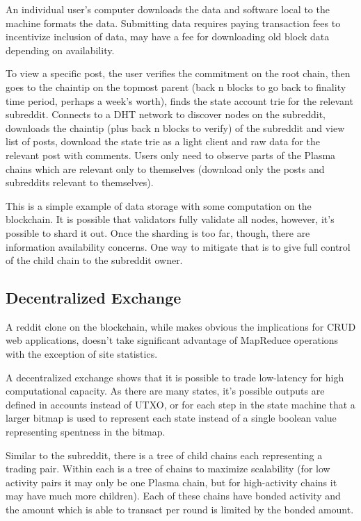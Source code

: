\documentclass[letterpaper, 11pt]{article}
\begin{document}
An individual user's computer downloads the data and software local to the
machine formats the data. Submitting data requires paying transaction fees to
incentivize inclusion of data, may have a fee for downloading old block data
depending on availability.

To view a specific post, the user verifies the commitment on the root chain,
then goes to the chaintip on the topmost parent (back n blocks to go back to
finality time period, perhaps a week's worth), finds the state account trie for
the relevant subreddit. Connects to a DHT network to discover nodes on the
subreddit, downloads the chaintip (plus back n blocks to verify) of the
subreddit and view list of posts, download the state trie as a light client and
raw data for the relevant post with comments. Users only need to observe parts
of the Plasma chains which are relevant only to themselves (download only the
posts and subreddits relevant to themselves).

This is a simple example of data storage with some computation on the
blockchain. It is possible that validators fully validate all nodes, however,
it's possible to shard it out. Once the sharding is too far, though, there are
information availability concerns. One way to mitigate that is to give full
control of the child chain to the subreddit owner.

\subsection{Decentralized Exchange}

A reddit clone on the blockchain, while makes obvious the implications for CRUD
web applications, doesn't take significant advantage of MapReduce operations
with the exception of site statistics.

A decentralized exchange shows that it is possible to trade low-latency for high
computational capacity. As there are many states, it's possible outputs are
defined in accounts instead of UTXO, or for each step in the state machine that
a larger bitmap is used to represent each state instead of a single boolean
value representing spentness in the bitmap.

Similar to the subreddit, there is a tree of child chains each representing a
trading pair. Within each is a tree of chains to maximize scalability (for low
activity pairs it may only be one Plasma chain, but for high-activity chains it
may have much more children). Each of these chains have bonded activity and the
amount which is able to transact per round is limited by the bonded amount.
\end{document}
